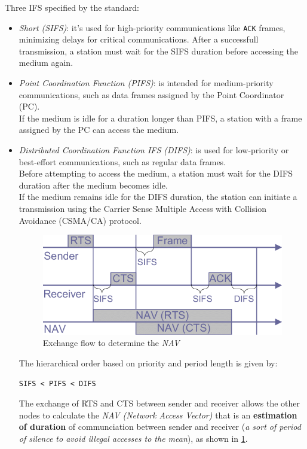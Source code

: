\documentclass[10pt,a4paper]{report}
\theoremstyle{definition}
\begin{document}
Three IFS specified by the standard:
\begin{itemize}
	\item 
	\textit{Short (SIFS)}: it's used for high-priority communications like \texttt{ACK} frames, minimizing delays for critical communications. After a successfull transmission, a station must wait for the SIFS duration before accessing the medium again.
	\item 
	\textit{Point Coordination Function (PIFS)}: is intended for medium-priority communications, such as data frames assigned by the Point Coordinator (PC).\\
	If the medium is idle for a duration longer than PIFS, a station with a frame assigned by the PC can access the medium.
	\item 
	\textit{Distributed Coordination Function IFS (DIFS)}: is used for low-priority or best-effort communications, such as regular data frames.\\
	Before attempting to access the medium, a station must wait for the DIFS duration after the medium becomes idle.\\
	If the medium remains idle for the DIFS duration, the station can initiate a transmission using the Carrier Sense Multiple Access with Collision Avoidance (CSMA/CA) protocol.

	\begin{figure}[h]
		\centering\includegraphics[scale=0.50]{images/Pasted image 20230301182340.png}
		\caption{Exchange flow to determine the \textit{NAV}}
		\label{estimation-duration}	
\end{figure}
The hierarchical order based on priority and period length is given by:
\begin{center}
	\texttt{SIFS < PIFS < DIFS}
\end{center}
	
The exchange of RTS and CTS between sender and receiver allows the other nodes to calculate the \textit{NAV (Network Access Vector)} that is an \textbf{estimation of duration} of communciation between sender and receiver (\textit{a sort of period of silence to avoid illegal accesses to the mean}), as shown in \ref{estimation-duration}.
\end{itemize}
\end{document}
